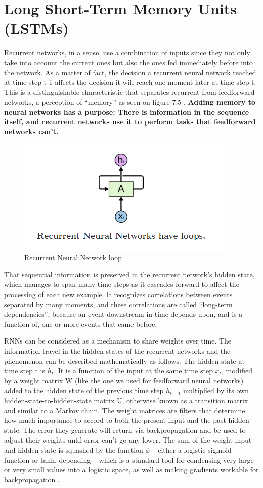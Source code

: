 \section{Long Short-Term Memory Units (LSTMs)}
Recurrent networks, in a sense, use a combination of inputs since they not only take into account the current ones but also the ones fed immediately before into the network. As a matter of fact, the decision a recurrent neural network reached at time step t-1 affects the decision it will reach one moment later at time step t. This is a distinguishable characteristic that separates recurrent from feedforward networks, a perception of “memory” as seen on figure 7.5 \cite{olah2015understanding}. \textbf{Adding memory to neural networks has a purpose: There is information in the sequence itself, and recurrent networks use it to perform tasks that feedforward networks can’t.}
\begin{figure}[ht!]
\centering
\includegraphics[width=0.7\linewidth]{project/rnn2.png}
\caption{Recurrent Neural Network loop}

\end{figure}
That sequential information is preserved in the recurrent network’s hidden state, which manages to span many time steps as it cascades forward to affect the processing of each new example. It recognizes correlations between events separated by many moments, and these correlations are called “long-term dependencies”, because an event downstream in time depends upon, and is a function of, one or more events that came before. 
\par RNNs can be considered as a mechanism to share weights over time. The information travel in the hidden states of the recurrent networks and the phenomenon can be described mathematically as follows. The hidden state at time step t is $h_{t}$. It is a function of the input at the same time step $x_{t}$, modified by a weight matrix W (like the one we used for feedforward neural networks) added to the hidden state of the previous time step $h_{t-1}$ multiplied by its own hidden-state-to-hidden-state matrix U, otherwise known as a transition matrix and similar to a Markov chain. The weight matrices are filters that determine how much importance to accord to both the present input and the past hidden state. The error they generate will return via backpropagation and be used to adjust their weights until error can’t go any lower. The sum of the weight input and hidden state is squashed by the function $\phi$ – either a logistic sigmoid function or tanh, depending – which is a standard tool for condensing very large or very small values into a logistic space, as well as making gradients workable for backpropagation \cite{palchak2013artificial}.
